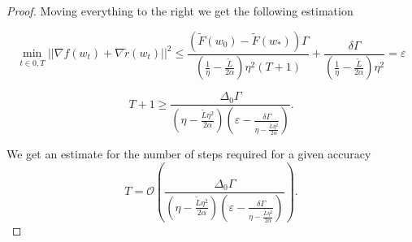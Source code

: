 \begin{proof}
Moving everything to the right we get the following estimation

\begin{equation*}
    \min_{t \in \overline{0, T}} ||\nabla f(w_t) + \nabla \tilde{r}(w_t)||^2 \leq \frac{(\tilde{F}(w_0) - \tilde{F}(w_*))\Gamma}{(\frac{1}{\eta} - \frac{\tilde{L}}{2\alpha}) \eta^2 (T+1)} + \frac{\delta \Gamma}{(\frac{1}{\eta} - \frac{\tilde{L}}{2\alpha}) \eta^2} = \varepsilon
\end{equation*}

\begin{equation*}
    T + 1 \geq \frac{\Delta_0 \Gamma}{(\eta - \frac{\tilde{L}\eta^2}{2\alpha}) \left( \varepsilon -\frac{\delta\Gamma}{\eta - \frac{\tilde{L}\eta^2}{2\alpha}}\right)}.
\end{equation*}

We get an estimate for the number of steps required for a given accuracy
\begin{equation*}
      T = \mathcal{O}\left( \frac{\Delta_0 \Gamma}{(\eta - \frac{\tilde{L}\eta^2}{2\alpha}) \left( \varepsilon -\frac{\delta\Gamma}{\eta - \frac{\tilde{L}\eta^2}{2\alpha}}\right)} \right).
\end{equation*}
\end{proof}


